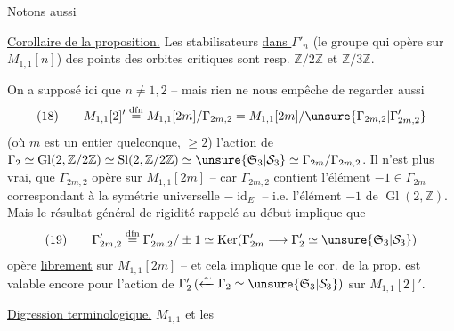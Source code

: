 Notons  aussi

\uline{Corollaire de la proposition.}  Les stabilisateurs \uline{dans $\Gamma'_n$} (le groupe qui opère \uline{} sur $M_{1,1}[n]$) des points des  orbites critiques sont resp. $\mathbb Z/2\mathbb Z$ et $\mathbb Z/3\mathbb Z$. 


On a supposé ici que $n\ne1,2$ -- mais rien ne nous empêche de regarder aussi 
\[
(18)\qquad M_{1,1}[2]'\overset{\mathrm{dfn}}{=}M_{1,1}[2m]/\Gamma_{2m,2}
=M_{1,1}[2m]/\unsure{\Gamma_{2m,2}|\Gamma'_{2m,2}}
\]
(où $m$ est un entier quelconque, $\ge2$)
l'action de $\Gamma_2\simeq\operatorname{Gl}(2,\mathbb Z/2\mathbb Z)\simeq\operatorname{Sl}(2,\mathbb Z/2\mathbb Z)\simeq\unsure{\mathfrak S_3|\mathcal S_3}\simeq\Gamma_{2m}/\Gamma_{2m,2}$.  Il n'est plus vrai,  que $\Gamma_{2m,2}$ opère  sur $M_{1,1}[2m]$ -- car $\Gamma_{2m,2}$ contient l'élément $-1\in\Gamma_{2m}$ correspondant à la symétrie universelle $-\operatorname{id}_E$ -- i.e.  l'élément  $-1$ de $\operatorname{Gl}(2,\mathbb Z)$. Mais le résultat général de rigidité rappelé au début implique que 
\[
(19)\qquad\Gamma'_{2m,2}\overset{\mathrm{dfn}}{=}\Gamma_{2m,2}'/\pm1
\simeq\operatorname{Ker}(\Gamma'_{2m}\longrightarrow\Gamma'_2\simeq\unsure{\mathfrak S_3|\mathcal S_3})
\]
opère   \uline{librement} sur $M_{1,1}[2m]$ -- et cela implique que le cor. de la prop. est valable encore pour l'action de $\Gamma'_2\,(\xleftarrow{\sim}\Gamma_2\simeq\unsure{\mathfrak S_3|\mathcal S_3})$ sur $M_{1,1}[2]'$.

\uline{Digression terminologique.} $M_{1,1}$  et les

